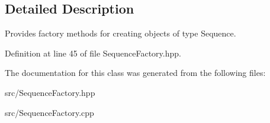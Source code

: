 \subsection{Detailed Description}
Provides factory methods for creating objects of type Sequence. 

Definition at line 45 of file Sequence\+Factory.\+hpp.



The documentation for this class was generated from the following files\+:\begin{DoxyCompactItemize}
\item 
src/Sequence\+Factory.\+hpp\item 
src/Sequence\+Factory.\+cpp\end{DoxyCompactItemize}
